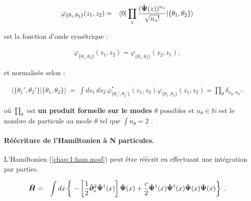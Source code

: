 \begin{eqnarray}
	\varphi_{\{\theta_1 , \theta_2\}}(z_1, z_2) & = & 	\langle 0 \vert \prod_z  \frac{(\hat{\bm{\Psi}}(z))^{n_z}}{\sqrt{n_z !}}\vert \{\theta_1, \theta_2\} \rangle
\end{eqnarray}



est la fonction d’onde symétrique :

\begin{eqnarray}
	\varphi_{\{\theta_1 , \theta_2\}}(z_1, z_2) = \varphi_{\{\theta_1 , \theta_2\}}(z_2, z_1),
\end{eqnarray}

et normalisée selon :

\begin{eqnarray}
	\langle \{\theta_1', \theta_2'\} \vert \{\theta_1, \theta_2\} \rangle ~=~ \int dz_1\, dz_2\, \varphi_{\{\theta_1' , \theta_2'\}}^\ast(z_1, z_2)\varphi_{\{\theta_1 , \theta_2\}}(z_1, z_2) = \prod_\theta\delta_{n_\theta^{},n_\theta'}.
\end{eqnarray}

où $\prod_\theta$ est {\bf un produit formelle sur le modes $\theta$} possibles et $n_\theta \in \mathbb{N}$ est le nombre de particule au mode $\theta$ tel que $\int n_\theta = 2$ .



\paragraph{Réécriture de l’Hamiltonien à N particules.}

L'Hamiltonien (\ref{chap:1:ham.mod}) peut être réécrit en effectuant une intégration par parties. 

\begin{eqnarray}
	\operator{H} & = & \int dx \left \{ -\left [\frac{1}{2}\operator{\partial}_x^2 \operator{\Psi}^\dag(x)\right ] \operator{\Psi}(x) + \frac{c}{2} \operator{\Psi}^\dag (x) \operator{\Psi}^\dag (x) \operator{\Psi} (x) \operator{\Psi} (x) \right \} \label{chap:1:ham.mod.2}.
\end{eqnarray}


